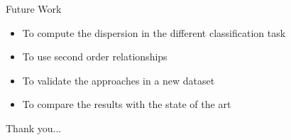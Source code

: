 \documentclass[usenames,dvipsnames]{beamer}
\begin{document}
\begin{frame}{Future Work}

\begin{itemize}
    \item To compute the dispersion in the different classification task
    \item To use second order relationships
    \item To validate the approaches in a new dataset
    \item To compare the results with the state of the art
     
\end{itemize}
    
\end{frame}
\begin{frame}
    Thank you...
\end{frame}
\end{document}
